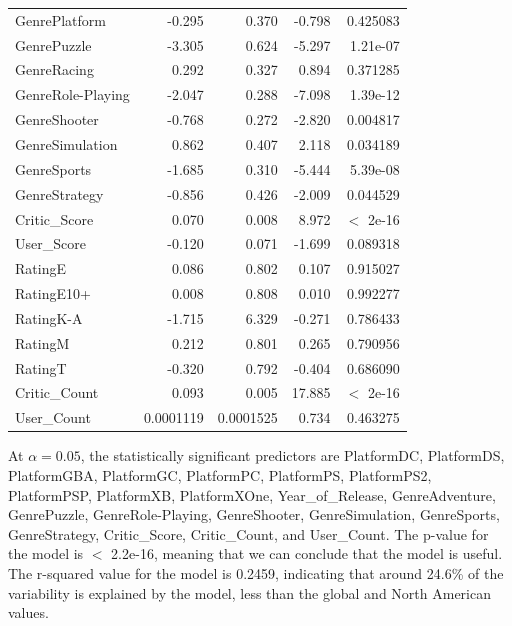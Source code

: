 \documentclass[12pt]{article}
\begin{document}
\begin{table}[ht]
\begin{tabular}{lrrrr}
    GenrePlatform & -0.295 & 0.370 & -0.798 & 0.425083 \\
    GenrePuzzle & -3.305 & 0.624 & -5.297 & 1.21e-07 \\
    GenreRacing & 0.292 & 0.327 & 0.894 & 0.371285 \\
    GenreRole-Playing & -2.047 & 0.288 & -7.098 & 1.39e-12 \\
    GenreShooter & -0.768 & 0.272 & -2.820 & 0.004817 \\
    GenreSimulation & 0.862 & 0.407 & 2.118 & 0.034189 \\
    GenreSports & -1.685 & 0.310 & -5.444 & 5.39e-08 \\
    GenreStrategy & -0.856 & 0.426 & -2.009 & 0.044529 \\
    Critic\_Score & 0.070 & 0.008 & 8.972 & $<$ 2e-16 \\
    User\_Score & -0.120 & 0.071 & -1.699 & 0.089318 \\
    RatingE & 0.086 & 0.802 & 0.107 & 0.915027 \\
    RatingE10+ & 0.008 & 0.808 & 0.010 & 0.992277 \\
    RatingK-A & -1.715 & 6.329 & -0.271 & 0.786433 \\
    RatingM & 0.212 & 0.801 & 0.265 & 0.790956 \\
    RatingT & -0.320 & 0.792 & -0.404 & 0.686090 \\
    Critic\_Count & 0.093 & 0.005 & 17.885 & $<$ 2e-16 \\
    User\_Count & 0.0001119 & 0.0001525 & 0.734 & 0.463275 \\
    \hline
  \end{tabular}
\end{table}

At $\alpha=0.05$, the statistically significant predictors are PlatformDC, PlatformDS, PlatformGBA, PlatformGC, PlatformPC, PlatformPS, 
PlatformPS2, PlatformPSP, PlatformXB, PlatformXOne, Year_of_Release, GenreAdventure, GenrePuzzle, GenreRole-Playing, GenreShooter, 
GenreSimulation, GenreSports, GenreStrategy, Critic_Score, Critic_Count, and User_Count.  
The p-value for the model is $<$ 2.2e-16, meaning that we can conclude that the model is useful. The r-squared value for the model is 0.2459,
indicating that around 24.6\% of the variability is explained by the model, less than the global and North American values.
\end{document}
